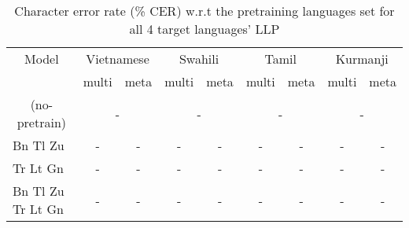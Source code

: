 \begin{table*}[ht!]
\centering
\caption{Character error rate (\si{\percent} CER) w.r.t the pretraining languages set for all 4 target languages' LLP}
\label{tab:llp-table}
\begin{tabular}{@{}ccccccccc@{}}
\toprule
Model                                    & \multicolumn{2}{c}{Vietnamese}                         & \multicolumn{2}{c}{Swahili}                        & \multicolumn{2}{c}{Tamil}                        & \multicolumn{2}{c}{Kurmanji} \\

                                         & multi           & meta                                & multi           & meta                                & multi           & meta                                & multi           & meta           \\ \midrule
\multicolumn{1}{c|}{(no-pretrain)}                   & \multicolumn{2}{c|}{-}                    & \multicolumn{2}{c|}{-}                    & \multicolumn{2}{c|}{-}          & \multicolumn{2}{c}{-}                    \\

\multicolumn{1}{l|}{Bn Tl Zu}   & -          & \multicolumn{1}{c|}{-}          & -          & \multicolumn{1}{c|}{-}          & -          & \multicolumn{1}{c|}{-}          & -          & -          \\
\multicolumn{1}{l|}{ \qquad \qquad Tr Lt Gn} & -          & \multicolumn{1}{c|}{-}          & -          & \multicolumn{1}{c|}{-}          & -          & \multicolumn{1}{c|}{-}          & -          & -          \\
\multicolumn{1}{l|}{Bn Tl Zu Tr Lt Gn}           & -          & \multicolumn{1}{c|}{-}          & -          & \multicolumn{1}{c|}{-}          & -          & \multicolumn{1}{c|}{-}          & -          & -          \\ \bottomrule
\end{tabular}
\end{table*}

